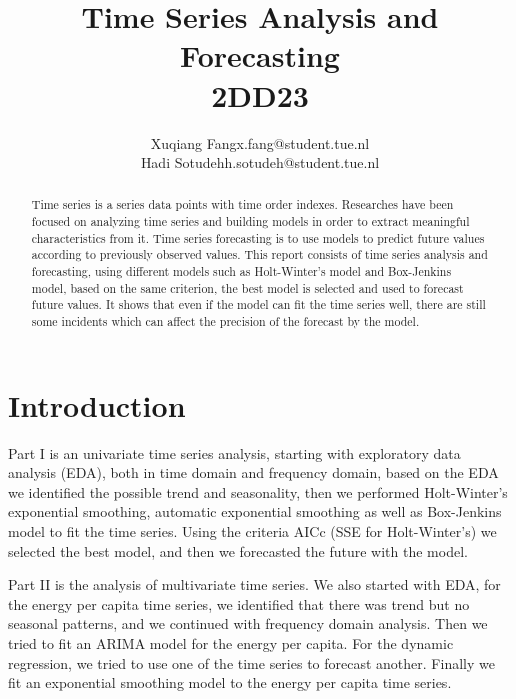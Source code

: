 \documentclass[journal, a4paper]{IEEEtran}
\begin{document}
	\title{Time Series Analysis and Forecasting \\2DD23}
	\author{Xuqiang Fang\quad x.fang@student.tue.nl\\ Hadi Sotudeh\quad h.sotudeh@student.tue.nl}
	\maketitle

\begin{abstract}
Time series is a series data points with time order indexes. Researches have been focused on analyzing time series and building models in order to extract meaningful characteristics from it. Time series forecasting is to use models to predict future values according to previously observed values. This report consists of time series analysis and forecasting, using different models such as Holt-Winter's model and Box-Jenkins model, based on the same criterion, the best model is selected and used to forecast future values. It shows that even if the model can fit the time series well, there are still some incidents which can affect the precision of the forecast by the model.
\end{abstract}

\section{Introduction}
Part I is an univariate time series analysis, starting with exploratory data analysis (EDA), both in time domain and frequency domain, based on the EDA we identified the possible trend and seasonality, then we performed Holt-Winter's exponential smoothing, automatic exponential smoothing as well as Box-Jenkins model to fit the time series. Using the criteria AICc (SSE for Holt-Winter's) we selected the best model, and then we forecasted the future with the model. 

Part II is the analysis of multivariate time series. We also started with EDA, for the energy per capita time series, we identified that there was trend but no seasonal patterns, and we continued with frequency domain analysis. Then we tried to fit an ARIMA model for the energy per capita. For the dynamic regression, we tried to use one of the time series to forecast another. Finally we fit an exponential smoothing model to the energy per capita time series.
\end{document}
